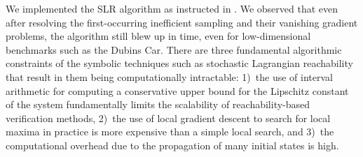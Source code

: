 \documentclass[letterpaper]{article} %
\begin{document}

We implemented the SLR algorithm as instructed in \cite{Gruenbacher2021verification}. We observed that even after resolving the first-occurring inefficient sampling and their vanishing gradient problems, the algorithm still blew up in time, even for low-dimensional benchmarks such as the Dubins Car. There are three fundamental algorithmic constraints of the symbolic techniques such as stochastic Lagrangian reachability that result in them being computationally intractable:
1)~the use of interval arithmetic for computing a conservative upper bound for the Lipschitz constant of the system fundamentally limits the scalability of reachability-based verification methods, 2)~the use of local gradient descent to search for local maxima in practice is more expensive than a simple local search, and 3)~the computational overhead due to the propagation of many initial states is high.


\end{document}
